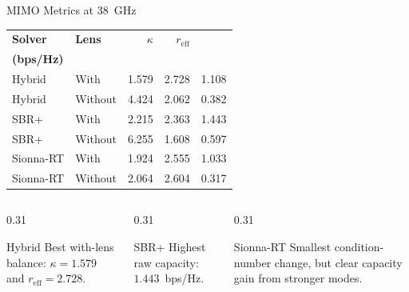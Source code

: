 \begin{frame}[t,shrink=8]{MIMO Metrics at 38~GHz}
    \centering
    \small
    \begin{tabular}{llrrr}
        \toprule
        \textbf{Solver} & \textbf{Lens} &
        \textbf{$\kappa$} & \textbf{$r_{\mathrm{eff}}$} &
        \makecell{\textbf{$C_{20\,\mathrm{dB}}$}\\\textbf{(bps/Hz)}} \\
        \midrule
        Hybrid    & With    & 1.579 & 2.728 & 1.108 \\
        Hybrid    & Without & 4.424 & 2.062 & 0.382 \\
        SBR+      & With    & 2.215 & 2.363 & 1.443 \\
        SBR+      & Without & 6.255 & 1.608 & 0.597 \\
        Sionna-RT & With    & 1.924 & 2.555 & 1.033 \\
        Sionna-RT & Without & 2.064 & 2.604 & 0.317 \\
        \bottomrule
    \end{tabular}

    \vspace{4mm}
    \begin{columns}[T,onlytextwidth]
        \begin{column}{0.31\textwidth}
            \begin{block}{Hybrid}
                Best with-lens balance:
                $\kappa=1.579$ and
                $r_{\mathrm{eff}}=2.728$.
            \end{block}
        \end{column}
        \begin{column}{0.31\textwidth}
            \begin{block}{SBR+}
                Highest raw capacity:
                $1.443$~bps/Hz.
            \end{block}
        \end{column}
        \begin{column}{0.31\textwidth}
            \begin{block}{Sionna-RT}
                Smallest condition-number change, but clear capacity gain from
                stronger modes.
            \end{block}
        \end{column}
    \end{columns}
\end{frame}

